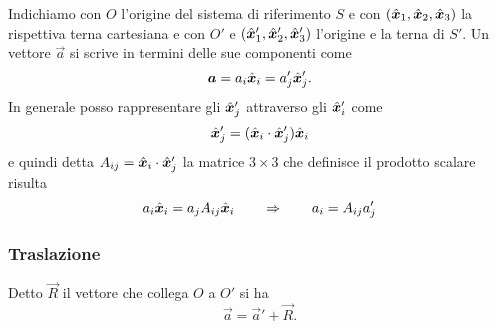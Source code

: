 Indichiamo con $ O $ l'origine del sistema di riferimento $ S $ e con $ (\hat{\boldsymbol{x}}_1, \hat{\boldsymbol{x}}_2, \hat{\boldsymbol{x}}_3) $ la rispettiva terna cartesiana e con $ O' $ e $ (\hat{\boldsymbol{x}}'_1, \hat{\boldsymbol{x}}'_2, \hat{\boldsymbol{x}}'_3) $ l'origine e la terna di $ S' $. Un vettore $ \vec a $ si scrive in termini delle sue componenti come \[\boldsymbol{a} = a_i \hat{\boldsymbol{x}}_i = a'_j \hat{\boldsymbol{x}}'_j.\] In generale posso rappresentare gli $ \hat{\boldsymbol{x}}'_j $ attraverso gli $ \hat{\boldsymbol{x}}'_i $ come \[\hat{\boldsymbol{x}}'_j = (\hat{\boldsymbol{x}}_i \cdot \hat{\boldsymbol{x}}'_j) \hat{\boldsymbol{x}}_i\] e quindi detta $ A_{ij} = \hat{\boldsymbol{x}}_i \cdot \hat{\boldsymbol{x}}'_j $ la matrice $ 3 \times 3 $ che definisce il prodotto scalare risulta
\begin{equation}
a_i \hat{\boldsymbol{x}}_i = a_j A_{ij} \hat{\boldsymbol{x}}_i \qquad \Rightarrow \qquad a_i = A_{ij} a'_j
\end{equation}

\subsubsection{Traslazione}
Detto $ \vec R $ il vettore che collega $ O $ a $ O' $ si ha 
\begin{equation}
\vec a = \vec a' + \vec R.
\end{equation}

